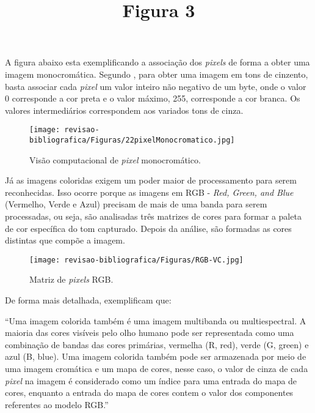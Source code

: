 A figura abaixo esta exemplificando a associação dos \textit{pixels} de forma a obter uma imagem monocromática. Segundo , para obter uma imagem em tons de cinzento, basta associar cada \textit{pixel} um valor inteiro não negativo de um byte, onde o valor 0 corresponde a cor preta e o valor máximo, 255, corresponde a cor branca. Os valores intermediários correspondem aos variados tons de cinza.


\title{Figura 3} 
\date{} %
\maketitle
\begin{figure}[!htb]
\caption{{\footnotesize Visão computacional de \textit{pixel} monocromático.} }
 
\centering %
\texttt{[image: revisao-bibliografica/Figuras/22pixelMonocromatico.jpg]}%
\label{figura:figura3}

\centering {}
{
\label{figura:figura3}
}
\end{figure}


Já as imagens coloridas exigem um poder maior de processamento para serem reconhecidas. Isso ocorre porque as imagens em RGB - \textit{Red, Green, and Blue} (Vermelho, Verde e Azul)  precisam de mais de uma banda para serem processadas, ou seja, são analisadas três matrizes de cores para formar a paleta de cor específica do tom capturado. Depois da análise, são formadas as cores distintas que compõe a imagem.


\begin{figure}[H]
\caption{ {\footnotesize Matriz de \textit{pixels} RGB.}}
 
\centering %
\texttt{[image: revisao-bibliografica/Figuras/RGB-VC.jpg]}%
\label{figura:figura4}

\centering {}
{
\label{figura:figura4}
}
\end{figure}
\FloatBarrier

De forma mais detalhada,  exemplificam que: 
\begin{quoting}[rightmargin=0cm,leftmargin=4cm]
\begin{singlespace}
{\footnotesize  
“Uma imagem colorida também é uma imagem multibanda ou multiespectral. A maioria das cores visíveis pelo olho humano pode ser representada como uma combinação de bandas das cores primárias, vermelha (R, red), verde (G, green) e azul (B, blue). Uma imagem colorida também pode ser armazenada por meio de uma imagem cromática e um mapa de cores, nesse caso, o valor de cinza de cada \textit{pixel} na imagem é considerado como um índice para uma entrada do mapa de cores, enquanto a entrada do mapa de cores contem o valor dos componentes referentes ao modelo RGB.”
}
\end{singlespace}
\end{quoting}

